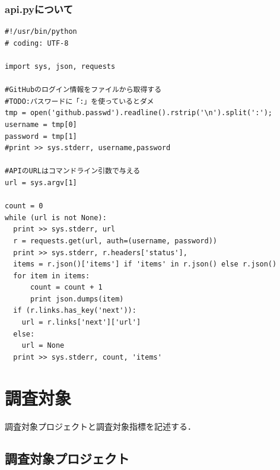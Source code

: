 \subsubsection{api.pyについて}
{
\small
\begin{verbatim}
#!/usr/bin/python
# coding: UTF-8

import sys, json, requests

#GitHubのログイン情報をファイルから取得する
#TODO:パスワードに「:」を使っているとダメ
tmp = open('github.passwd').readline().rstrip('\n').split(':');
username = tmp[0]
password = tmp[1]
#print >> sys.stderr, username,password

#APIのURLはコマンドライン引数で与える
url = sys.argv[1]

count = 0
while (url is not None):
  print >> sys.stderr, url
  r = requests.get(url, auth=(username, password))
  print >> sys.stderr, r.headers['status'],
  items = r.json()['items'] if 'items' in r.json() else r.json()
  for item in items:
      count = count + 1
      print json.dumps(item)
  if (r.links.has_key('next')):
    url = r.links['next']['url']
  else:
    url = None
  print >> sys.stderr, count, 'items'
\end{verbatim}
}


\section{調査対象}

調査対象プロジェクトと調査対象指標を記述する．

\subsection{調査対象プロジェクト}

